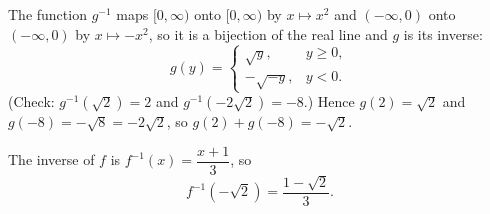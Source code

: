 The function $g^{-1}$ maps $[0,\infty)$ onto $[0,\infty)$ by $x\mapsto x^2$ and $(-\infty,0)$ onto $(-\infty,0)$ by $x\mapsto-x^2$, so it is a bijection of the real line and $g$ is its inverse:
\[g(y)=\begin{cases}\sqrt y,&y\ge0,\\-\sqrt{-y},&y<0.\end{cases}\]
(Check: $g^{-1}\left(\sqrt2\right)=2$ and $g^{-1}\left(-2\sqrt2\right)=-8$.) Hence $g(2)=\sqrt2$ and $g(-8)=-\sqrt8=-2\sqrt2$, so $g(2)+g(-8)=-\sqrt2$.

The inverse of $f$ is $f^{-1}(x)=\dfrac{x+1}{3}$, so
\[f^{-1}\left(-\sqrt2\right)=\boxed{\dfrac{1-\sqrt2}{3}}.\]
